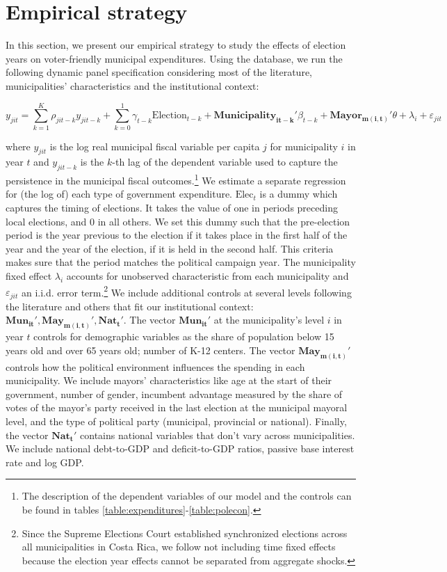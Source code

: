 \section{Empirical strategy}

In this section, we present our empirical strategy to study the effects of election years on voter-friendly municipal expenditures. Using the database, we run the following dynamic panel specification considering most of the literature, municipalities' characteristics and the institutional context: 

\begin{equation}\label{eq:main_specification}
	y_{jit} = \sum_{k=1}^{K} \rho_{jit-k} y_{jit-k} + \sum_{k=0}^{1} \gamma_{t-k} \text{Election}_{t-k} + \mathbf{Municipality_{it-k}'}\beta_{t-k} + \mathbf{Mayor_{m(i,t)}'}\theta + \lambda_i + \varepsilon_{jit}
\end{equation}

where $y_{jit}$ is the log real municipal fiscal variable per capita $j$ for municipality $i$ in year $t$ and $y_{jit-k}$ is the $k$-th lag of the dependent variable used to capture the persistence in the municipal fiscal outcomes.\footnote{The description of the dependent variables of our model and the controls can be found in tables \ref{table:expenditures}-\ref{table:polecon}. } We estimate a separate regression for (the log of) each type of government expenditure. $\text{Elec}_t$ is a dummy which captures the timing of elections. It takes the value of one in periods preceding local elections, and 0 in all others. We set this dummy such that the pre-election period is the year previous to the election if it takes place in the first half of the year and the year of the election, if it is held in the second half. This criteria makes sure that the period matches the political campaign year. The municipality fixed effect $\lambda_i$ accounts for unobserved characteristic from each municipality and $\varepsilon_{jit}$ an i.i.d. error term.\footnote{Since the Supreme Elections Court established synchronized elections across all municipalities in Costa Rica, we follow \textcite{chortareas2016} not including time fixed effects because the election year effects cannot be separated from aggregate shocks. }  We include additional controls at several levels following the literature and others that fit our institutional context: $\mathbf{Mun_{it}'},\mathbf{May_{m(i,t)}'},\mathbf{Nat_{t}'}$. The vector $\mathbf{Mun_{it}'}$ at the municipality's level $i$ in year $t$ controls for demographic variables as the share of population below 15 years old and over 65 years old; number of K-12 centers. The vector $\mathbf{May_{m(i,t)}'}$ controls how the political environment influences the spending in each municipality. We include mayors' characteristics like age at the start of their government, number of  gender, incumbent advantage measured by the share of votes of the mayor's party received in the last election at the municipal mayoral level, and the type of political party (municipal, provincial or national). Finally, the vector $\mathbf{Nat_{t}'}$ contains national variables that don't vary across municipalities. We include national debt-to-GDP and deficit-to-GDP ratios, passive base interest rate and log GDP. 

